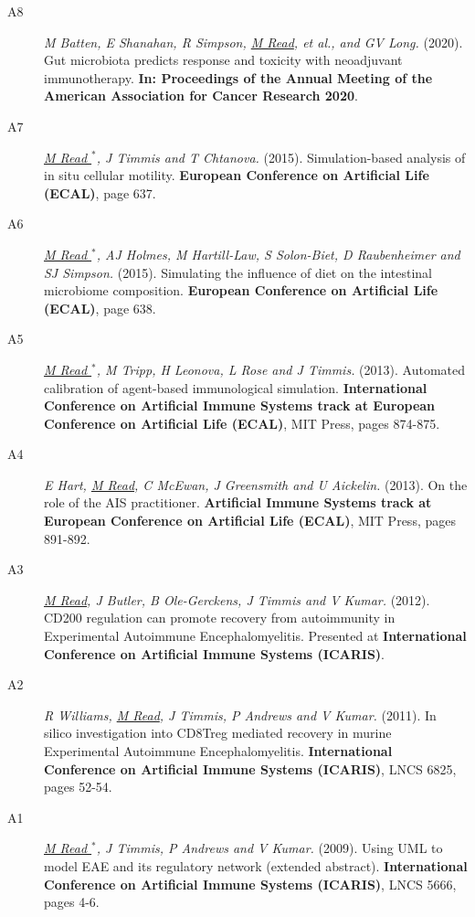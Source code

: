 \documentclass[a4paper]{article}
\begin{document}
\begin{description}
\item[A8]
\textit{M Batten, E Shanahan, R Simpson, \underline{M Read}, et al., and GV Long.}
(2020).
Gut microbiota predicts response and toxicity with neoadjuvant immunotherapy.
\textbf{In: Proceedings of the Annual Meeting of the American Association for Cancer Research 2020}.

\item[A7]
\textit{\underline{M Read $^{*}$}, J Timmis and T Chtanova.}
(2015).
Simulation-based analysis of in situ cellular motility.
\textbf{European Conference on Artificial Life (ECAL)}, page 637.

\item[A6]
\textit{\underline{M Read $^{*}$}, AJ Holmes, M Hartill-Law, S Solon-Biet, D Raubenheimer and SJ Simpson.}
(2015).
Simulating the influence of diet on the intestinal microbiome composition.
\textbf{European Conference on Artificial Life (ECAL)}, page 638.

\item[A5]
\textit{\underline{M Read $^{*}$}, M Tripp, H Leonova, L Rose and J Timmis.}
(2013).
Automated calibration of agent-based immunological simulation.
\textbf{International Conference on Artificial Immune Systems track at European Conference on Artificial Life (ECAL)}, MIT Press, pages 874-875.

\item[A4]
\textit{E Hart, \underline{M Read}, C McEwan, J Greensmith and U Aickelin.}
(2013).
On the role of the AIS practitioner.
\textbf{Artificial Immune Systems track at European Conference on Artificial Life (ECAL)}, MIT Press, pages 891-892.

\item[A3]
\textit{\underline{M Read}, J Butler, B Ole-Gerckens, J Timmis and V Kumar.}
(2012).
CD200 regulation can promote recovery from autoimmunity in Experimental Autoimmune Encephalomyelitis.
Presented at \textbf{International Conference on Artificial Immune Systems (ICARIS)}.

\item[A2]
\textit{R Williams, \underline{M Read}, J Timmis, P Andrews and V Kumar.}
(2011).
In silico investigation into CD8Treg mediated recovery in murine Experimental Autoimmune Encephalomyelitis.
\textbf{International Conference on Artificial Immune Systems (ICARIS)}, LNCS 6825, pages 52-54.

\item[A1]
\textit{\underline{M Read $^{*}$}, J Timmis, P Andrews and V Kumar.}
(2009).
Using UML to model EAE and its regulatory network (extended abstract).
\textbf{International Conference on Artificial Immune Systems (ICARIS)}, LNCS 5666, pages 4-6.
\end{description}
\end{document}
